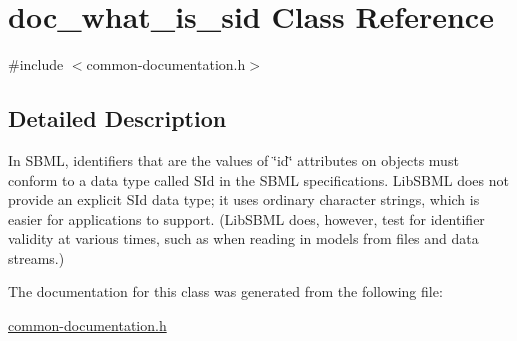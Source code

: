 \hypertarget{classdoc__what__is__sid}{}\section{doc\+\_\+what\+\_\+is\+\_\+sid Class Reference}
\label{classdoc__what__is__sid}


{\ttfamily \#include $<$common-\/documentation.\+h$>$}



\subsection{Detailed Description}
\begin{DoxyParagraph}{}
In S\+B\+ML, identifiers that are the values of \char`\"{}id\char`\"{} attributes on objects must conform to a data type called {\ttfamily S\+Id} in the S\+B\+ML specifications. Lib\+S\+B\+ML does not provide an explicit {\ttfamily S\+Id} data type; it uses ordinary character strings, which is easier for applications to support. (Lib\+S\+B\+ML does, however, test for identifier validity at various times, such as when reading in models from files and data streams.) 
\end{DoxyParagraph}


The documentation for this class was generated from the following file\+:\begin{DoxyCompactItemize}
\item 
\hyperlink{common-documentation_8h}{common-\/documentation.\+h}\end{DoxyCompactItemize}

